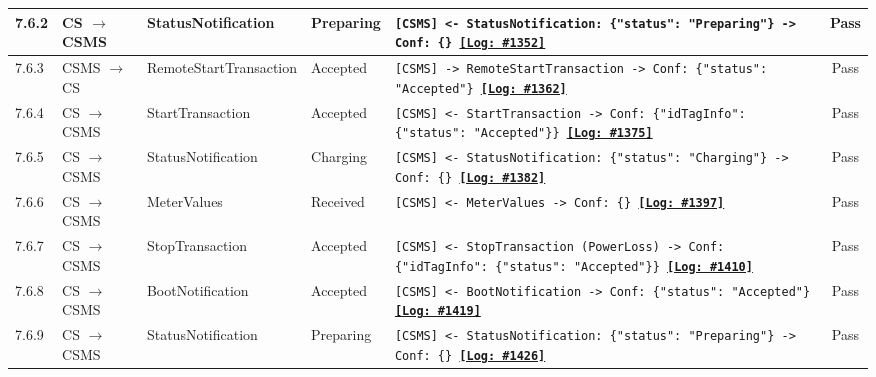 \documentclass[10pt, a4paper, landscape]{article}
\begin{document}
\begin{longtable}{|p{1.0cm}|p{2.5cm}|p{4.0cm}|p{5.0cm}|p{10.0cm}|c|}
\hline
7.6.2 & CS $\to$ CSMS & StatusNotification & Preparing & \footnotesize\texttt{[CSMS] <- StatusNotification: \{"status": "Preparing"\} \newline [CSMS] -> Conf: \{\} \newline \hyperref[log:7.6.2]{\textbf{[Log: \#1352]}}} & Pass \\
\hline
7.6.3 & CSMS $\to$ CS & RemoteStartTransaction & Accepted & \footnotesize\texttt{[CSMS] -> RemoteStartTransaction \newline [CS] -> Conf: \{"status": "Accepted"\} \newline \hyperref[log:7.6.3]{\textbf{[Log: \#1362]}}} & Pass \\
\hline
7.6.4 & CS $\to$ CSMS & StartTransaction & Accepted & \footnotesize\texttt{[CSMS] <- StartTransaction \newline [CSMS] -> Conf: \{"idTagInfo": \{"status": "Accepted"\}\} \newline \hyperref[log:7.6.4]{\textbf{[Log: \#1375]}}} & Pass \\
\hline
7.6.5 & CS $\to$ CSMS & StatusNotification & Charging & \footnotesize\texttt{[CSMS] <- StatusNotification: \{"status": "Charging"\} \newline [CSMS] -> Conf: \{\} \newline \hyperref[log:7.6.5]{\textbf{[Log: \#1382]}}} & Pass \\
\hline
7.6.6 & CS $\to$ CSMS & MeterValues & Received & \footnotesize\texttt{[CSMS] <- MeterValues \newline [CSMS] -> Conf: \{\} \newline \hyperref[log:7.6.6]{\textbf{[Log: \#1397]}}} & Pass \\
\hline
7.6.7 & CS $\to$ CSMS & StopTransaction & Accepted & \footnotesize\texttt{[CSMS] <- StopTransaction (PowerLoss) \newline [CSMS] -> Conf: \{"idTagInfo": \{"status": "Accepted"\}\} \newline \hyperref[log:7.6.7]{\textbf{[Log: \#1410]}}} & Pass \\
\hline
7.6.8 & CS $\to$ CSMS & BootNotification & Accepted & \footnotesize\texttt{[CSMS] <- BootNotification \newline [CSMS] -> Conf: \{"status": "Accepted"\} \newline \hyperref[log:7.6.8]{\textbf{[Log: \#1419]}}} & Pass \\
\hline
7.6.9 & CS $\to$ CSMS & StatusNotification & Preparing & \footnotesize\texttt{[CSMS] <- StatusNotification: \{"status": "Preparing"\} \newline [CSMS] -> Conf: \{\} \newline \hyperref[log:7.6.9]{\textbf{[Log: \#1426]}}} & Pass \\

\end{longtable}
\end{document}
